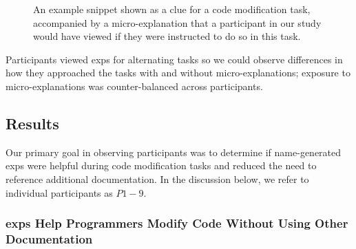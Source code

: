 \begin{figure}
\centering
{}
\caption{An example snippet shown as a clue for a code modification task, accompanied by a micro-explanation that a participant in our study would have viewed if they were instructed to do so in this task.}
\label{fig:study_snippet}
\end{figure}

Participants viewed \glspl{exp} for alternating tasks so we could observe differences in how they approached the tasks with and without micro-explanations; exposure to micro-explanations was counter-balanced across participants. 




\subsection{Results}

Our primary goal in observing participants was to determine if \gls{name}-generated \glspl{exp} were helpful  during code modification tasks and reduced the need to reference additional documentation.
In the discussion below, we refer to individual participants as $P{1-9}$.

\subsubsection{ \Glspl{exp} Help Programmers Modify Code Without Using Other Documentation}

